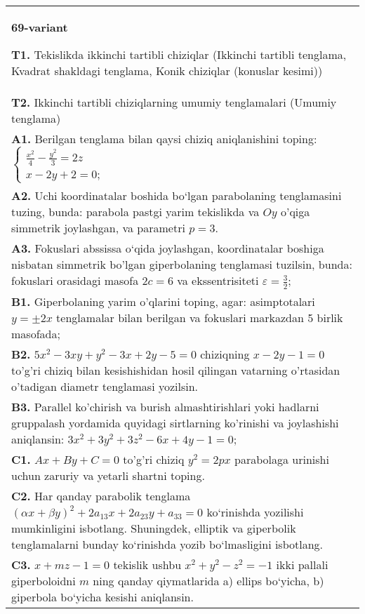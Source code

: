 \documentclass{article}
\begin{document}
\begin{tabular}{m{17cm}}
\textbf{69-variant}
\newline

\textbf{T1.} Tekislikda ikkinchi tartibli chiziqlar (Ikkinchi tartibli tenglama, Kvadrat shakldagi tenglama, Konik chiziqlar (konuslar kesimi)) \\
\textbf{T2.} Ikkinchi tartibli chiziqlarning umumiy tenglamalari (Umumiy tenglama) \\
\textbf{A1.} Berilgan tenglama bilan qaysi chiziq aniqlanishini toping: $\left\{\begin{array}{l}\frac{x^2}{4}-\frac{y^2}{3}=2 z \\ x-2 y+2=0 ;\end{array}\right.$ \\
\textbf{A2.} Uchi koordinatalar boshida bo‘lgan parabolaning tenglamasini tuzing, bunda: parabola pastgi yarim tekislikda va $Oy$ o'qiga simmetrik joylashgan, va parametri $p=3$. \\
\textbf{A3.} Fokuslari abssissa o‘qida joylashgan, koordinatalar boshiga nisbatan simmetrik bo'lgan giperbolaning tenglamasi tuzilsin, bunda: fokuslari orasidagi masofa $2 c=6$ va ekssentrisiteti $\varepsilon=\frac{3}{2}$; \\
\textbf{B1.} Giperbolaning yarim o'qlarini toping, agar: asimptotalari $y= \pm 2 x$ tenglamalar bilan berilgan va fokuslari markazdan 5 birlik masofada; \\
\textbf{B2.} $5 x^2-3 x y+y^2-3 x+2 y-5=0$ chiziqning $x-2 y-1=0$ to'g'ri chiziq bilan kesishishidan hosil qilingan vatarning o'rtasidan o'tadigan diametr tenglamasi yozilsin. \\
\textbf{B3.} Parallel ko'chirish va burish almashtirishlari yoki hadlarni gruppalash yordamida quyidagi sirtlarning ko'rinishi va joylashishi aniqlansin: $3 x^2+3 y^2+3 z^2-6 x+4 y-1=0$; \\
\textbf{C1.} $A x+B y+C=0$ to'g'ri chiziq $y^2=2 p x$ parabolaga urinishi uchun zaruriy va yetarli shartni toping. \\
\textbf{C2.} Har qanday parabolik tenglama $ (\alpha x+\beta y) ^2+2a_{13}x+2a_{23}y+a_{33}=0$ ko‘rinishda yozilishi mumkinligini isbotlang. Shuningdek, elliptik va giperbolik tenglamalarni bunday ko‘rinishda yozib bo‘lmasligini isbotlang. \\
\textbf{C3.} $x+m z-1=0$ tekislik ushbu $x^2+y^2-z^2=-1$ ikki pallali giperboloidni $m$ ning qanday qiymatlarida a) ellips bo‘yicha, b) giperbola bo‘yicha kesishi aniqlansin. \\

\end{tabular}
\vspace{1cm}
\end{document}
